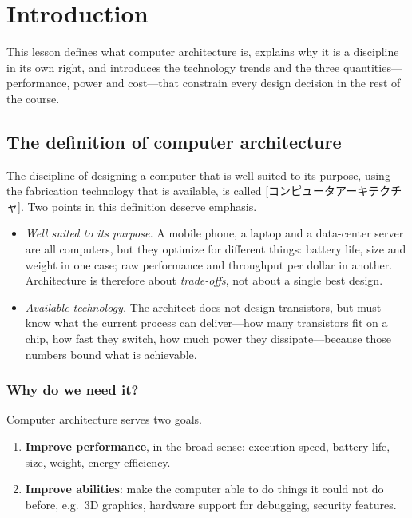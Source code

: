 \documentclass[../main.tex]{subfiles}
\begin{document}
\chapter{Introduction}

This lesson defines what computer architecture is, explains why it is a
discipline in its own right, and introduces the technology trends and the
three quantities---performance, power and cost---that constrain every design
decision in the rest of the course.

\section{The definition of computer architecture}

The discipline of designing a computer that is well suited to its purpose,
using the fabrication technology that is available, is called
[コンピュータアーキテクチャ].  Two points in this
definition deserve emphasis.

\begin{itemize}
  \item \emph{Well suited to its purpose.}  A mobile phone, a laptop and a
    data-center server are all computers, but they optimize for different
    things: battery life, size and weight in one case; raw performance and
    throughput per dollar in another.  Architecture is therefore about
    \emph{trade-offs}, not about a single best design.
  \item \emph{Available technology.}  The architect does not design
    transistors, but must know what the current process can deliver---how
    many transistors fit on a chip, how fast they switch, how much power they
    dissipate---because those numbers bound what is achievable.
\end{itemize}

\subsection{Why do we need it?}

Computer architecture serves two goals.
\begin{enumerate}
  \item \textbf{Improve performance}, in the broad sense: execution speed,
    battery life, size, weight, energy efficiency.
  \item \textbf{Improve abilities}: make the computer able to do things it
    could not do before, e.g.\ 3D graphics, hardware support for debugging,
    security features.
\end{enumerate}
\end{document}
